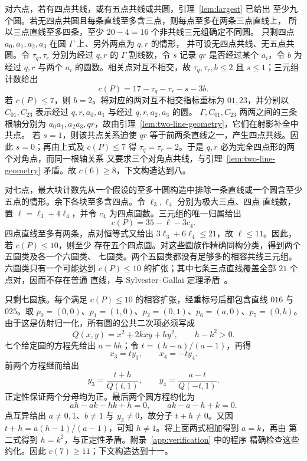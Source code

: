 \documentclass[11pt,a4paper]{ctexart}
\theoremstyle{definition}
\begin{document}
对六点，若有四点共线，或有五点共线或共圆，引理~\ref{lem:largest} 已给出
至少九个圆。若无四点共圆且每条直线至多含三点，则每点至多在两条三点直线上，
所以三点直线至多四条，至少 $20-4=16$ 个非共线三元组确定不同圆。
只剩四点 $a_0,a_1,a_2,a_3$ 在圆 $\Gamma$ 上、另外两点为 $q,r$ 的情形，
并可设无四点共线、无五点共圆。令 $\tau_q,\tau_r$ 分别为经过 $q,r$ 的
$\Gamma$ 割线数，令 $s$ 记录 $qr$ 是否经过某个 $a_i$，令 $b$ 为经过
$q,r$ 与两个 $a_i$ 的圆数。相关点对互不相交，故
$\tau_q,\tau_r,b\le2$ 且 $s\le1$；三元组计数给出
\[
c(P)=17-\tau_q-\tau_r-s-3b.
\]
若 $c(P)\le7$，则 $b=2$。将对应的两对互不相交指标重标为 $01,23$，并分别以
$C_{01},C_{23}$ 表示经过 $q,r,a_0,a_1$ 与经过 $q,r,a_2,a_3$ 的圆。
$\Gamma,C_{01},C_{23}$ 两两之间的三条根轴分别为
$a_0a_1,a_2a_3,qr$，故由引理~\ref{lem:two-line-geometry}，它们在射影补全中共点。
若 $s=1$，则该共点关系迫使
$qr$ 等于前两条直线之一，产生四点共线。因此 $s=0$；再由上式及
$c(P)\le7$ 得 $\tau_q=\tau_r=2$。于是 $q,r$ 必为完全四点形的两个对角点，而同一根轴关系
又要求三个对角点共线，与引理~\ref{lem:two-line-geometry} 矛盾。故
$c(6)\ge8$，下文构造达到八。

对七点，最大块计数先从一个假设的至多十圆构造中排除一条直线或一个圆含至少
五点的情形。余下各块至多含四点。令 $\ell_3,\ell_4$ 分别为极大三点、四点
直线数，置 $\ell=\ell_3+4\ell_4$，并令 $c_4$ 为四点圆数。三元组的唯一归属给出
\[
c(P)=35-\ell-3c_4.
\]
四点直线至多有两条，点对恒等式又给出
$3\ell_3+6\ell_4\le21$，故 $\ell\le11$。因此，若 $c(P)\le10$，则至少
存在五个四点圆。对这些圆族作精确同构分类，得到两个五圆类及各一个六圆类、
七圆类。两个五圆类都没有足够多的相容共线三元组。六圆类只有一个可能达到
$c(P)\le10$ 的扩张；其中七条三点直线覆盖全部 $21$ 个点对，因而不存在普通
直线，与 Sylvester--Gallai 定理矛盾~\cite[pp.~111--112]{borwein-moser}。

只剩七圆族。每个满足 $c(P)\le10$ 的相容扩张，经重标号后都包含直线
$016$ 与 $025$。取
$p_0=(0,0)$、$p_1=(1,0)$、$p_2=(0,1)$、$p_6=(a,0)$、$p_5=(0,b)$。
由于这是仿射归一化，所有圆的公共二次项必须写成
\[
 Q(x,y)=x^2+2kxy+hy^2,\qquad h-k^2>0.
\]
七个给定圆的方程先给出 $a=bh$；令 $t=(h-a)/(a-1)$，再得
\[
 x_3=ty_3,\qquad x_4=-ty_4.
\]
前两个方程继而给出
\[
 y_3=\frac{t+h}{Q(t,1)},\qquad
 y_4=\frac{a-t}{Q(-t,1)}.
\]
正定性保证两个分母均为正。最后两个圆方程约化为
\[
 ah-ak-hk+h=0,\qquad ak-a-h+k=0.
\]
点互异给出 $a\ne0,1$、$b\ne1$ 与 $y_3\ne0$，故分子 $t+h\ne0$。又因
$t+h=a(h-1)/(a-1)$，可知 $h\ne1$。将上面两式相加得到 $a=k$，再由
第二式得到 $h=k^2$，与正定性矛盾。附录~\ref{app:verification} 中的程序
精确检查这些约化。因此 $c(7)\ge11$；下文构造达到十一。
\end{document}
